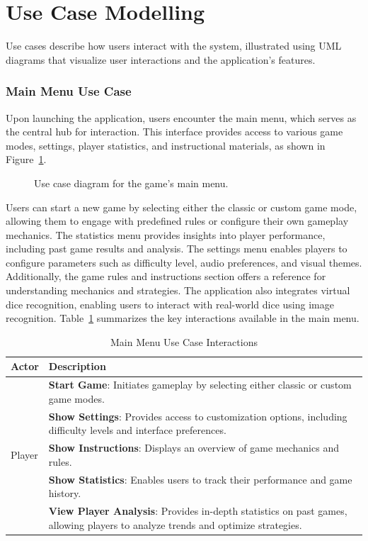 \section{Use Case Modelling}
Use cases describe how users interact with the system, illustrated using UML diagrams that visualize user interactions and the application's features.

\subsubsection{Main Menu Use Case}
Upon launching the application, users encounter the main menu, which serves as the central hub for interaction. This interface provides access to various game modes, settings, player statistics, and instructional materials, as shown in Figure~\ref{fig:main_menu_usecase}.

\begin{figure}[ht!]
    \centering
    
    \caption{Use case diagram for the game's main menu.}
    \label{fig:main_menu_usecase}
\end{figure}

Users can start a new game by selecting either the classic or custom game mode, allowing them to engage with predefined rules or configure their own gameplay mechanics. The statistics menu provides insights into player performance, including past game results and analysis. The settings menu enables players to configure parameters such as difficulty level, audio preferences, and visual themes. Additionally, the game rules and instructions section offers a reference for understanding mechanics and strategies. The application also integrates virtual dice recognition, enabling users to interact with real-world dice using image recognition. Table~\ref{tab:main_menu_usecase} summarizes the key interactions available in the main menu.

\begin{table}[ht!]
    \centering
    \caption{Main Menu Use Case Interactions}
    \label{tab:main_menu_usecase}
    \begin{tabular}{|l|p{12cm}|}
        \hline
        \textbf{Actor} & \textbf{Description} \\
        \hline
               & \textbf{Start Game}: Initiates gameplay by selecting either classic or custom game modes. \\
               & \textbf{Show Settings}: Provides access to customization options, including difficulty levels and interface preferences. \\
        Player & \textbf{Show Instructions}: Displays an overview of game mechanics and rules. \\
               & \textbf{Show Statistics}: Enables users to track their performance and game history. \\
               & \textbf{View Player Analysis}: Provides in-depth statistics on past games, allowing players to analyze trends and optimize strategies. \\
        \hline
    \end{tabular}    
\end{table}

